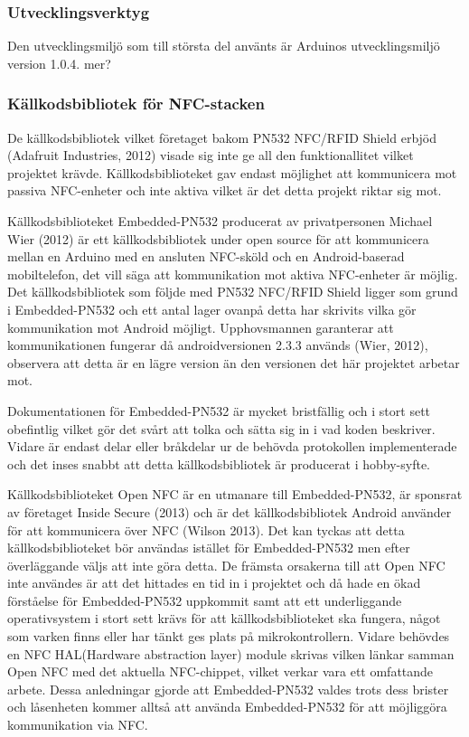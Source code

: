 \documentclass[11pt]{article}
\begin{document}
\subsubsection{Utvecklingsverktyg}
Den utvecklingsmiljö som till största del använts är Arduinos utvecklingsmiljö version 1.0.4. mer?

\subsubsection{Källkodsbibliotek för NFC-stacken}
De källkodsbibliotek vilket företaget bakom PN532 NFC/RFID Shield erbjöd (Adafruit Industries, 2012) visade sig inte ge all den funktionallitet vilket projektet krävde. Källkodsbiblioteket gav endast möjlighet att kommunicera mot passiva NFC-enheter och inte aktiva vilket är det detta projekt riktar sig mot. 

Källkodsbiblioteket Embedded-PN532 producerat av privatpersonen Michael Wier (2012) är ett källkodsbibliotek under open source för att kommunicera mellan en Arduino med en ansluten NFC-sköld och en Android-baserad mobiltelefon, det vill säga att kommunikation mot aktiva NFC-enheter är möjlig. Det källkodsbibliotek som följde med PN532 NFC/RFID Shield ligger som grund i Embedded-PN532 och ett antal lager ovanpå detta har skrivits vilka gör kommunikation mot Android möjligt. Upphovsmannen garanterar att kommunikationen fungerar då androidversionen 2.3.3 används (Wier, 2012), observera att detta är en lägre version än den versionen det här projektet arbetar mot. 

Dokumentationen för Embedded-PN532 är mycket bristfällig och i stort sett obefintlig vilket gör det svårt att tolka och sätta sig in i vad koden beskriver. Vidare är endast delar eller bråkdelar ur de behövda protokollen implementerade och det inses snabbt att detta källkodsbibliotek är producerat i hobby-syfte. 

Källkodsbiblioteket Open NFC är en utmanare till Embedded-PN532, är sponsrat av företaget Inside Secure (2013) och är det källkodsbibliotek Android använder för att kommunicera över NFC (Wilson 2013). Det kan tyckas att detta källkodsbiblioteket bör användas istället för Embedded-PN532 men efter överläggande väljs att inte göra detta. De främsta orsakerna till att Open NFC inte användes är att det hittades en tid in i projektet och då hade en ökad förståelse för Embedded-PN532 uppkommit samt att ett underliggande operativsystem i stort sett krävs för att källkodsbiblioteket ska fungera, något som varken finns eller har tänkt ges plats på mikrokontrollern. Vidare behövdes en NFC HAL(Hardware abstraction layer) module skrivas vilken länkar samman Open NFC med det aktuella NFC-chippet, vilket verkar vara ett omfattande arbete. Dessa anledningar gjorde att Embedded-PN532 valdes trots dess brister och låsenheten kommer alltså att använda Embedded-PN532 för att möjliggöra kommunikation via NFC.
\end{document}
